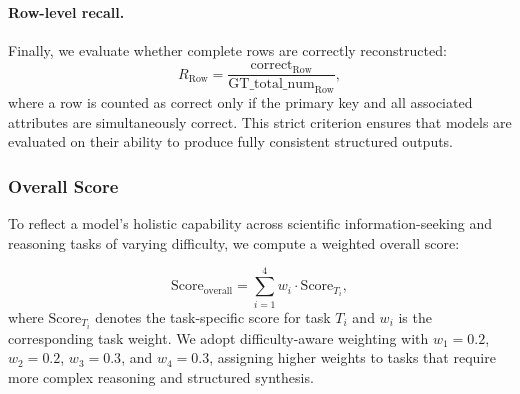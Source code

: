 \paragraph{Row-level recall.}
Finally, we evaluate whether complete rows are correctly reconstructed:
\begin{equation}
R_{\text{Row}} =
\frac{\text{correct}_{\text{Row}}}
{\text{GT\_total\_num}_{\text{Row}}},
\end{equation}
where a row is counted as correct only if the primary key and all associated attributes are simultaneously correct.
This strict criterion ensures that models are evaluated on their ability to produce fully consistent structured outputs.



\subsubsection{Overall Score}

To reflect a model’s holistic capability across scientific information-seeking and reasoning tasks of varying difficulty, we compute a weighted overall score:

\begin{equation}
\text{Score}_{\text{overall}} = \sum_{i=1}^{4} w_i \cdot \text{Score}_{T_i},
\end{equation}
where $\text{Score}_{T_i}$ denotes the task-specific score for task $T_i$ and $w_i$ is the corresponding task weight.
We adopt difficulty-aware weighting with
$w_1 = 0.2$, $w_2 = 0.2$, $w_3 = 0.3$, and $w_4 = 0.3$,
assigning higher weights to tasks that require more complex reasoning and structured synthesis.




